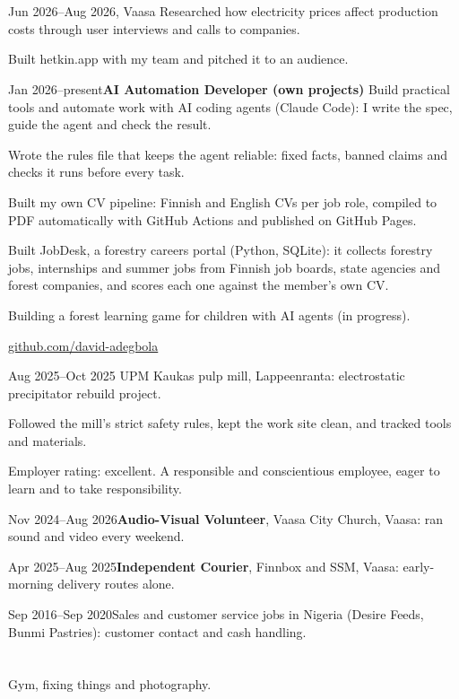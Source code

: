 \documentclass[a4paper,11pt]{article}
\begin{document}
\section{}
\begin{cventry}{Jun 2026--Aug 2026}{, Vaasa}
  Researched how electricity prices affect production costs through user interviews and calls to companies.\par
  Built hetkin.app with my team and pitched it to an audience.
\end{cventry}
\begin{cventry}{Jan 2026--present}{\textbf{AI Automation Developer (own projects)}}
  Build practical tools and automate work with AI coding agents (Claude Code): I write the spec, guide the agent and check the result.\par
  Wrote the rules file that keeps the agent reliable: fixed facts, banned claims and checks it runs before every task.\par
  Built my own CV pipeline: Finnish and English CVs per job role, compiled to PDF automatically with GitHub Actions and published on GitHub Pages.\par
  Built JobDesk, a forestry careers portal (Python, SQLite): it collects forestry jobs, internships and summer jobs from Finnish job boards, state agencies and forest companies, and scores each one against the member's own CV.\par
  Building a forest learning game for children with AI agents (in progress).\par
  \faGithub{} \href{https://github.com/david-adegbola}{github.com/david-adegbola}
\end{cventry}
\begin{cventry}{Aug 2025--Oct 2025}{}
  UPM Kaukas pulp mill, Lappeenranta: electrostatic precipitator rebuild project.\par
  Followed the mill's strict safety rules, kept the work site clean, and tracked tools and materials.\par
  Employer rating: excellent. A responsible and conscientious employee, eager to learn and to take responsibility.
\end{cventry}
\begin{cventry}{Nov 2024--Aug 2026}{\textbf{Audio-Visual Volunteer}, Vaasa City Church, Vaasa: ran sound and video every weekend.}
\end{cventry}
\begin{cventry}{Apr 2025--Aug 2025}{\textbf{Independent Courier}, Finnbox and SSM, Vaasa: early-morning delivery routes alone.}
\end{cventry}
\begin{cventry}{Sep 2016--Sep 2020}{Sales and customer service jobs in Nigeria (Desire Feeds, Bunmi Pastries): customer contact and cash handling.}
\end{cventry}

\section{}
Gym, fixing things and photography.

\section{}
\end{document}

